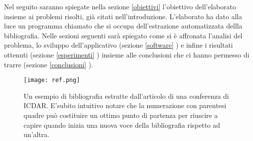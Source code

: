 Nel seguito saranno spiegate nella sezione \ref{obiettivi} l'obiettivo dell'elaborato insieme ai problemi risolti, già citati nell'introduzione. L'elaborato ha dato alla luce un programma chiamato \textit{} che si occupa dell'estrazione automatizzata dellla bibliografia. Nelle sezioni seguenti sarà spiegato come si è affronata l'analisi del problema, lo sviluppo dell'applicativo (sezione \ref{software} ) e infine i risultati ottenuti (sezione \ref{esperimenti} ) insieme alle conclusioni che ci hanno permesso di trarre (sezione \ref{conclusioni} ).


\begin{figure}[htb]
\begin{center}
\texttt{[image: ref.png]}
\end{center}
\caption[Un esempio di bibliografia]{Un esempio di bibliografia estratte dall'articolo di una conferenza di ICDAR. E'subito intuitivo notare che la numerazione con parentesi quadre può costituire un ottimo punto di partenza per riuscire a capire quando inizia una nuova voce della bibliografia rispetto ad un'altra.}
\label{fig:ref-examples}
\end{figure}



